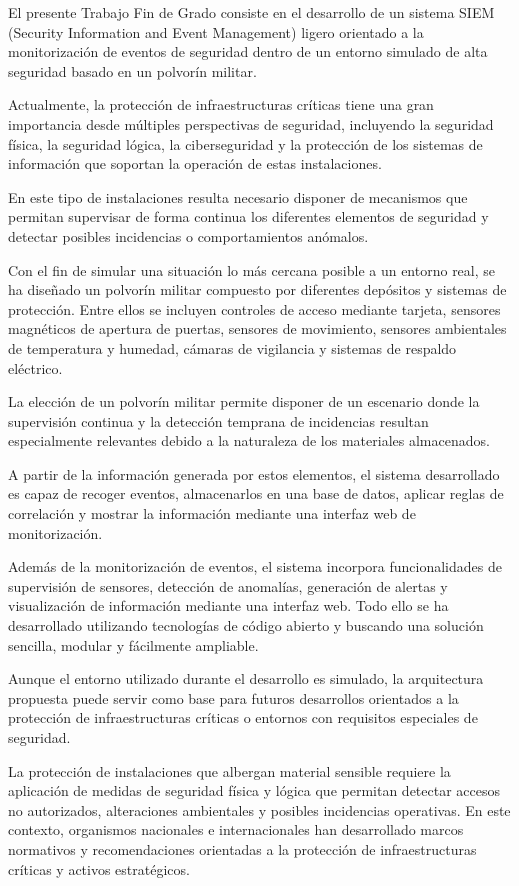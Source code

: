 El presente Trabajo Fin de Grado consiste en el desarrollo de un sistema SIEM (Security Information and Event Management) ligero orientado a la monitorización de eventos de seguridad dentro de un entorno simulado de alta seguridad basado en un polvorín militar.

Actualmente, la protección de infraestructuras críticas tiene una gran importancia desde múltiples perspectivas de seguridad, incluyendo la seguridad física, la seguridad lógica, la ciberseguridad y la protección de los sistemas de información que soportan la operación de estas instalaciones.

En este tipo de instalaciones resulta necesario disponer de mecanismos que permitan supervisar de forma continua los diferentes elementos de seguridad y detectar posibles incidencias o comportamientos anómalos.

Con el fin de simular una situación lo más cercana posible a un entorno real, se ha diseñado un polvorín militar compuesto por diferentes depósitos y sistemas de protección. Entre ellos se incluyen controles de acceso mediante tarjeta, sensores magnéticos de apertura de puertas, sensores de movimiento, sensores ambientales de temperatura y humedad, cámaras de vigilancia y sistemas de respaldo eléctrico.

La elección de un polvorín militar permite disponer de un escenario donde la supervisión continua y la detección temprana de incidencias resultan especialmente relevantes debido a la naturaleza de los materiales almacenados.

A partir de la información generada por estos elementos, el sistema desarrollado es capaz de recoger eventos, almacenarlos en una base de datos, aplicar reglas de correlación y mostrar la información mediante una interfaz web de monitorización. 

Además de la monitorización de eventos, el sistema incorpora funcionalidades de supervisión de sensores, detección de anomalías, generación de alertas y visualización de información mediante una interfaz web. Todo ello se ha desarrollado utilizando tecnologías de código abierto y buscando una solución sencilla, modular y fácilmente ampliable.

Aunque el entorno utilizado durante el desarrollo es simulado, la arquitectura propuesta puede servir como base para futuros desarrollos orientados a la protección de infraestructuras críticas o entornos con requisitos especiales de seguridad.

La protección de instalaciones que albergan material sensible requiere la aplicación de medidas de seguridad física y lógica que permitan detectar accesos no autorizados, alteraciones ambientales y posibles incidencias operativas. En este contexto, organismos nacionales e internacionales han desarrollado marcos normativos y recomendaciones orientadas a la protección de infraestructuras críticas y activos estratégicos.

